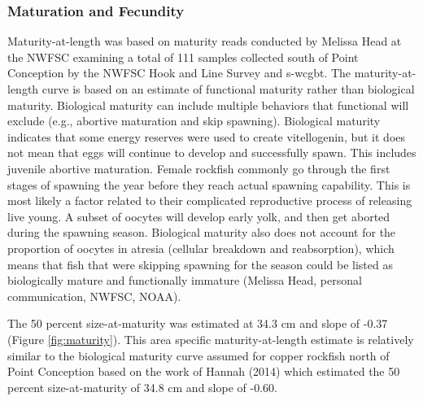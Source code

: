 \documentclass[11pt,
  english,
  a4paper,
]{article}
\begin{document}
\leavevmode\tagmcend\tagstructend\par


\hypertarget{maturation-and-fecundity}{%
\subsubsection{Maturation and Fecundity}\label{maturation-and-fecundity}}

\leavevmode\tagmcend\tagstructend


Maturity-at-length was based on maturity reads conducted by Melissa Head at the NWFSC examining a total of 111 samples collected south of Point Conception by the NWFSC Hook and Line Survey and \Gls{s-wcgbt}. The maturity-at-length curve is based on an estimate of functional maturity rather than biological maturity. Biological maturity can include multiple behaviors that functional will exclude (e.g., abortive maturation and skip spawning). Biological maturity indicates that some energy reserves were used to create vitellogenin, but it does not mean that eggs will continue to develop and successfully spawn. This includes juvenile abortive maturation. Female rockfish commonly go through the first stages of spawning the year before they reach actual spawning capability. This is most likely a factor related to their complicated reproductive process of releasing live young. A subset of oocytes will develop early yolk, and then get aborted during the spawning season. Biological maturity also does not account for the proportion of oocytes in atresia (cellular breakdown and reabsorption), which means that fish that were skipping spawning for the season could be listed as biologically mature and functionally immature (Melissa Head, personal communication, NWFSC, NOAA).

\leavevmode\tagmcend\tagstructend\par


The 50 percent size-at-maturity was estimated at 34.3 cm and slope of -0.37 (Figure \ref{fig:maturity}). This area specific maturity-at-length estimate is relatively similar to the biological maturity curve assumed for copper rockfish north of Point Conception based on the work of Hannah {(2014)\leavevmode\tagmcend\tagstructend} which estimated the 50 percent size-at-maturity of 34.8 cm and slope of -0.60.
\end{document}
